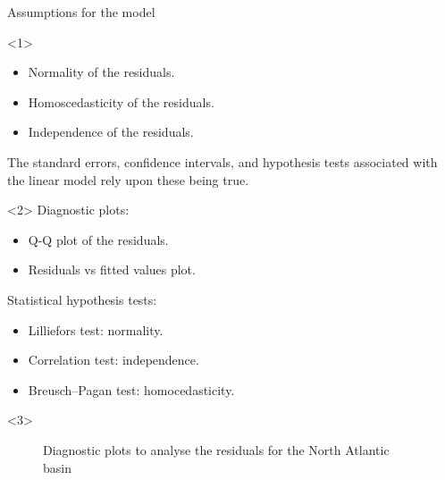 \begin{frame}[label=intro-objectives]{Assumptions for the model}
	\begin{onlyenv}
		\begin{itemize}
			\item Normality of the residuals.
			\item Homoscedasticity of the residuals.
			\item Independence of the residuals.
		\end{itemize}
		The standard errors, confidence intervals, and hypothesis tests associated with the linear model rely upon these being true.
	\end{onlyenv}

	\begin{onlyenv}
		Diagnostic plots:
		\begin{itemize}
			\item Q-Q plot of the residuals.
			\item Residuals vs fitted values plot.
		\end{itemize}

		\bigskip
		Statistical hypothesis tests:
		\begin{itemize}
			\item Lilliefors test: normality.
			\item Correlation test: independence.
			\item Breusch--Pagan test: homocedasticity.
		\end{itemize}
	\end{onlyenv}

	\begin{onlyenv}
		\begin{figure}[H]
			\centering
			\caption{Diagnostic plots to analyse the residuals for the North Atlantic basin}
			\label{fig:natl_residuals}
		\end{figure}
	\end{onlyenv}


\end{frame}
